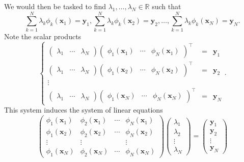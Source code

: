 \documentclass[12pt]{report} %
\newcommand{\tmmathbf}[1]{\ensuremath{\boldsymbol{#1}}}
\begin{document}
We would then be tasked to find $\lambda_1, \ldots, \lambda_N \in \mathbb{R}$
such that
\[ \sum_{k = 1}^N \lambda_k \phi_k (\tmmathbf{x}_1) =\tmmathbf{y}_1, \sum_{k =
   1}^N \lambda_k \phi_k (\tmmathbf{x}_2) =\tmmathbf{y}_2, \ldots, \sum_{k =
   1}^N \lambda_k \phi_k (\tmmathbf{x}_N) =\tmmathbf{y}_N . \]
Note the scalar products
\[ \left\{\begin{array}{cll}
     \left(\begin{array}{ccc}
       \lambda_1 & \cdots  & \lambda_N
     \end{array}\right) \left(\begin{array}{ccc}
       \phi_1 (\tmmathbf{x}_1) & \cdots  & \phi_N (\tmmathbf{x}_1)
     \end{array}\right)^{\top} & = & \tmmathbf{y}_1\\
     \left(\begin{array}{ccc}
       \lambda_1 & \cdots  & \lambda_N
     \end{array}\right) \left(\begin{array}{ccc}
       \phi_1 (\tmmathbf{x}_2) & \cdots  & \phi_N (\tmmathbf{x}_2)
     \end{array}\right)^{\top} & = & \tmmathbf{y}_2\\
     \vdots &  & \\
     \left(\begin{array}{ccc}
       \lambda_1 & \cdots  & \lambda_N
     \end{array}\right) \left(\begin{array}{ccc}
       \phi_1 (\tmmathbf{x}_N) & \cdots  & \phi_N (\tmmathbf{x}_N)
     \end{array}\right)^{\top} & = & \tmmathbf{y}_N
   \end{array}\right. . \]
This system induces the system of linear equations
\begin{equation}
  \left(\begin{array}{cccc}
    \phi_1 (\tmmathbf{x}_1) & \phi_2 (\tmmathbf{x}_1) & \cdots  & \phi_N
    (\tmmathbf{x}_1)\\
    \phi_1 (\tmmathbf{x}_2) & \phi_2 (\tmmathbf{x}_2) & \cdots  & \phi_N
    (\tmmathbf{x}_2)\\
    \vdots & \vdots &  & \vdots\\
    \phi_1 (\tmmathbf{x}_N) & \phi_2 (\tmmathbf{x}_N) & \cdots  & \phi_N
    (\tmmathbf{x}_N)
  \end{array}\right) \left(\begin{array}{c}
    \lambda_1\\
    \lambda_2\\
    \vdots\\
    \lambda_N
  \end{array}\right) = \left(\begin{array}{c}
    \tmmathbf{y}_1\\
    \tmmathbf{y}_2\\
    \vdots\\
    \tmmathbf{y}_N
  \end{array}\right) \label{linear-system-equations-generalized-poly}
\end{equation}
\end{document}
